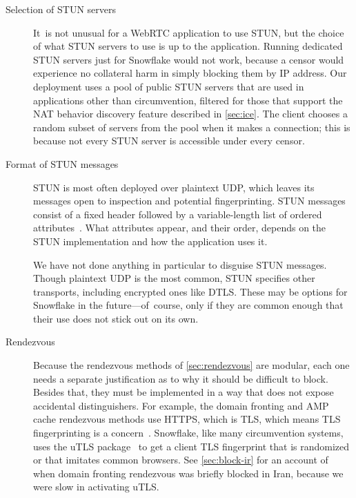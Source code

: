\documentclass[letterpaper,twocolumn]{article}
\begin{document}
\begin{description}
\item[Selection of STUN servers]
It~is not unusual for a WebRTC application to use STUN,
but the choice of what STUN servers to use is up to the application.
Running dedicated STUN servers just for Snowflake would not work,
because a censor would experience no collateral harm in
simply blocking them by IP address.
Our deployment uses a pool of public STUN servers
that are used in applications other than circumvention,
filtered for those that support the NAT behavior discovery feature
described in \autoref{sec:ice}.
The client chooses a random subset of servers from the pool
when it makes a connection;
this is because not every STUN server is accessible
under every censor.

\item[Format of STUN messages]
STUN is most often deployed over plaintext UDP,
which leaves its messages open to inspection
and potential fingerprinting.
STUN messages consist of a fixed header
followed by a variable-length list of ordered
attributes~\cite[\S 5]{rfc8489}.
What attributes appear,
and their order,
depends on the STUN implementation
and how the application uses it.

We have not done anything in particular
to disguise STUN messages.
Though plaintext UDP is the most common,
STUN specifies other transports,
including encrypted ones like DTLS.
These may be options for Snowflake in the future---of~course,
only if they are common enough that their use
does not stick out on its own.

\item[Rendezvous]
Because the rendezvous methods of
\autoref{sec:rendezvous}
are modular,
each one needs a separate justification
as to why it should be difficult to block.
Besides that, they must be implemented in a way
that does not expose accidental distinguishers.
For example, the domain fronting and AMP cache rendezvous methods
use HTTPS, which is TLS,
which means TLS fingerprinting is a concern~\cite[\S 5.1]{Fifield2015a}.
Snowflake, like many circumvention systems,
uses the uTLS package~\cite[\S VII]{Frolov2019a}
to get a client TLS fingerprint that is randomized or that imitates common browsers.
See \autoref{sec:block-ir} for an account of when
domain fronting rendezvous was briefly blocked in Iran,
because we were slow in activating uTLS.


\end{description}
\end{document}
